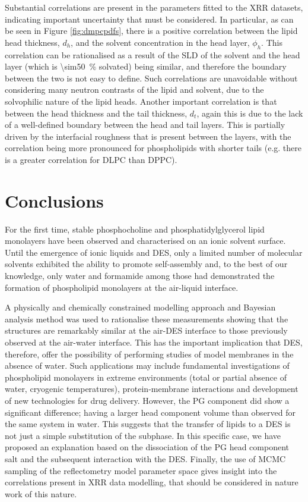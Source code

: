 \documentclass[amsmath,amssymb,twocolumn,superscriptaddress]{revtex4-1}
\begin{document}
Substantial correlations are present in the parameters fitted to the XRR datasets, indicating important uncertainty that must be considered.
In particular, as can be seen in Figure \ref{fig:dmpcpdfs}, there is a positive correlation between the lipid head thickness, $d_h$, and the solvent concentration in the head layer, $\phi_h$.
This correlation can be rationalised as a result of the SLD of the solvent and the head layer (which is \SI{\sim50}{\percent} solvated) being similar, and therefore the boundary between the two is not easy to define.
Such correlations are unavoidable without considering many neutron contrasts of the lipid and solvent, due to the solvophilic nature of the lipid heads.
Another important correlation is that between the head thickness and the tail thickness, $d_t$, again this is due to the lack of a well-defined boundary between the head and tail layers.
This is partially driven by the interfacial roughness that is present between the layers, with the correlation being more pronounced for phospholipids with shorter tails (e.g. there is a greater correlation for DLPC than DPPC).

\section{Conclusions}
%
For the first time, stable phosphocholine and phosphatidylglycerol lipid monolayers have been observed and characterised on an ionic solvent surface.
Until the emergence of ionic liquids and DES, only a limited number of molecular solvents exhibited the ability to promote self-assembly and, to the best of our knowledge, only water and formamide among those had demonstrated the formation of phospholipid monolayers at the air-liquid interface.

A physically and chemically constrained modelling approach and Bayesian analysis method was used to rationalise these measurements showing that the structures are remarkably similar at the air-DES interface to those previously observed at the air-water interface.
This has the important implication that DES, therefore, offer the possibility of performing studies of model membranes in the absence of water.
Such applications may include fundamental investigations of phospholipid monolayers in extreme environments (total or partial absence of water, cryogenic temperatures), protein-membrane interactions and development of new technologies for drug delivery.
However, the PG component did show a significant difference; having a larger head component volume than observed for the same system in water.
This suggests that the transfer of lipids to a DES is not just a simple substitution of the subphase.
In this specific case, we have proposed an explanation based on the dissociation of the PG head component salt and the subsequent interaction with the DES.
Finally, the use of MCMC sampling of the reflectometry model parameter space gives insight into the correlations present in XRR data modelling, that should be considered in nature work of this nature.
\end{document}
